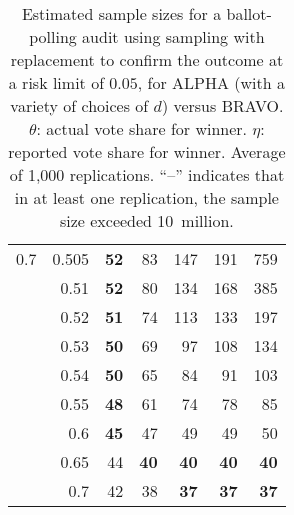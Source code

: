 \documentclass[12pt,runningheads]{llncs}
\begin{document}
{\begin{table}
\begin{tabular}{lr|rrrr|r}
\hline
0.7 & 0.505 & \bf{52} & 83 & 147 & 191  & 759 \\
     & 0.51 & \bf{52} & 80 & 134 & 168  & 385 \\
     & 0.52 & \bf{51} & 74 & 113 & 133  & 197 \\
     & 0.53 & \bf{50} & 69 & 97 & 108  & 134 \\
     & 0.54 & \bf{50} & 65 & 84 & 91  & 103 \\
     & 0.55 & \bf{48} & 61 & 74 & 78  & 85 \\
     & 0.6 & \bf{45} & 47 & 49 & 49  & 50 \\
     & 0.65 & 44 & \bf{40} & \bf{40} & \bf{40}  & \bf{40} \\
     & 0.7 & 42 & 38 & \bf{37} & \bf{37}  & \bf{37}
\end{tabular}
\caption{\protect \label{tab:results} Estimated sample sizes for a ballot-polling audit using sampling with replacement
to confirm the outcome at a risk limit of $0.05$, for ALPHA (with a variety of choices of
$d$) versus BRAVO.
$\theta$: actual vote share for winner.
$\eta$: reported vote share for winner.
Average of 1,000 replications.
``--'' indicates that in at least one replication, the sample size exceeded 10~million.
}
\end{table}

}
\end{document}
